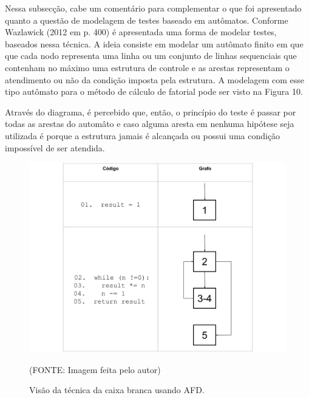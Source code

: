 \documentclass[
    12pt,       %
    openright,      %
    twoside,      %
    a4paper,      %
    english,      %
    french,       %
    spanish,      %
    brazil,       %
    ]{abntex2}
\begin{document}
              Nessa subsecção, cabe um comentário para complementar o que foi apresentado quanto a
              questão de modelagem de testes baseado em autômatos. Conforme Wazlawick (2012 em p. 400) é
              apresentada uma forma de modelar testes, baseados nessa técnica. A ideia consiste em
              modelar um autômato finito em que que cada nodo representa uma linha ou um conjunto de
              linhas sequenciais que contenham no máximo uma estrutura de controle e as arestas
              representam o atendimento ou não da condição imposta pela estrutura. A modelagem
              com esse tipo autômato para o método de cálculo de fatorial pode ser visto na Figura 10.

              Através do diagrama, é percebido que, então, o princípio do teste é passar por todas as
              arestas do automâto e caso alguma aresta em nenhuma hipótese seja utilizada é porque a
              estrutura jamais é alcançada ou possui uma condição impossível de ser atendida.

              \begin{figure}[htbp]
                  \begin{center}
                      \includegraphics[width=1.0\textwidth]{img/whitebox.png}
                  \end{center}
              \caption{\label{fig:passaro}Visão da técnica da caixa branca usando AFD.}
              \begin{center}(FONTE: Imagem feita pelo autor)\end{center}
              \end{figure}
\end{document}
